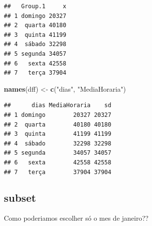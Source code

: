 \documentclass[]{book}
\newenvironment{Shaded}{\begin{snugshade}}{\end{snugshade}}
\newcommand{\KeywordTok}[1]{\textcolor[rgb]{0.13,0.29,0.53}{\textbf{#1}}}
\newcommand{\DataTypeTok}[1]{\textcolor[rgb]{0.13,0.29,0.53}{#1}}
\newcommand{\StringTok}[1]{\textcolor[rgb]{0.31,0.60,0.02}{#1}}
\newcommand{\CommentTok}[1]{\textcolor[rgb]{0.56,0.35,0.01}{\textit{#1}}}
\newcommand{\OperatorTok}[1]{\textcolor[rgb]{0.81,0.36,0.00}{\textbf{#1}}}
\newcommand{\NormalTok}[1]{#1}
\theoremstyle{definition}
\theoremstyle{definition}
\theoremstyle{definition}
\theoremstyle{remark}
\begin{document}
\begin{verbatim}
##   Group.1     x
## 1 domingo 20327
## 2  quarta 40180
## 3  quinta 41199
## 4  sábado 32298
## 5 segunda 34057
## 6   sexta 42558
## 7   terça 37904
\end{verbatim}

\begin{Shaded}
\begin{Highlighting}[]
\KeywordTok{names}\NormalTok{(dff) <-}\StringTok{ }\KeywordTok{c}\NormalTok{(}\StringTok{"dias"}\NormalTok{, }\StringTok{"MediaHoraria"}\NormalTok{)}
\end{Highlighting}
\end{Shaded}

\begin{Shaded}
\end{Shaded}

\begin{verbatim}
##      dias MediaHoraria    sd
## 1 domingo        20327 20327
## 2  quarta        40180 40180
## 3  quinta        41199 41199
## 4  sábado        32298 32298
## 5 segunda        34057 34057
## 6   sexta        42558 42558
## 7   terça        37904 37904
\end{verbatim}

\subsection{subset}\label{subset}

Como poderiamos escolher só o mes de janeiro??

\begin{Shaded}
\end{Shaded}
\end{document}
